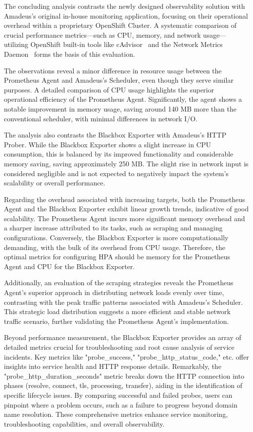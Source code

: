 The concluding analysis contrasts the newly designed observability solution with Amadeus's original in-house monitoring application, focusing on their operational overhead within a proprietary OpenShift Cluster. A systematic comparison of crucial performance metrics—such as \ac{CPU}, memory, and network usage—utilizing OpenShift built-in tools like cAdvisor~\parencite{GoogleCadvisor2024} and the Network Metrics Daemon~\parencite{OpenshiftNetworkmetricsdaemon2023} forms the basis of this evaluation. 

The observations reveal a minor difference in resource usage between the Prometheus Agent and Amadeus's Scheduler, even though they serve similar purposes. A detailed comparison of \ac{CPU} usage highlights the superior operational efficiency of the Prometheus Agent. Significantly, the agent shows a notable improvement in memory usage, saving around 140 MB more than the conventional scheduler, with minimal differences in network I/O. 

The analysis also contrasts the Blackbox Exporter with Amadeus's \ac{HTTP} Prober. While the Blackbox Exporter shows a slight increase in \ac{CPU} consumption, this is balanced by its improved functionality and considerable memory saving, saving approximately 250 MB. The slight rise in network input is considered negligible and is not expected to negatively impact the system's scalability or overall performance. 

Regarding the overhead associated with increasing targets, both the Prometheus Agent and the Blackbox Exporter exhibit linear growth trends, indicative of good scalability. The Prometheus Agent incurs more significant memory overhead and a sharper increase attributed to its tasks, such as scraping and managing configurations. Conversely, the Blackbox Exporter is more computationally demanding, with the bulk of its overhead from \ac{CPU} usage. Therefore, the optimal metrics for configuring \ac{HPA} should be memory for the Prometheus Agent and \ac{CPU} for the Blackbox Exporter. 

Additionally, an evaluation of the scraping strategies reveals the Prometheus Agent's superior approach in distributing network loads evenly over time, contrasting with the peak traffic patterns associated with Amadeus's Scheduler. This strategic load distribution suggests a more efficient and stable network traffic scenario, further validating the Prometheus Agent's implementation. 

Beyond performance measurement, the Blackbox Exporter provides an array of detailed metrics crucial for troubleshooting and root cause analysis of service incidents. Key metrics like "probe\_success," "probe\_http\_status\_code," etc. offer insights into service health and \ac{HTTP} response details. Remarkably, the "probe\_http\_duration\_seconds" metric breaks down the \ac{HTTP} connection into phases (resolve, connect, tls, processing, transfer), aiding in the identification of specific lifecycle issues. By comparing successful and failed probes, users can pinpoint where a problem occurs, such as a failure to progress beyond domain name resolution. These comprehensive metrics enhance service monitoring, troubleshooting capabilities, and overall observability. 

